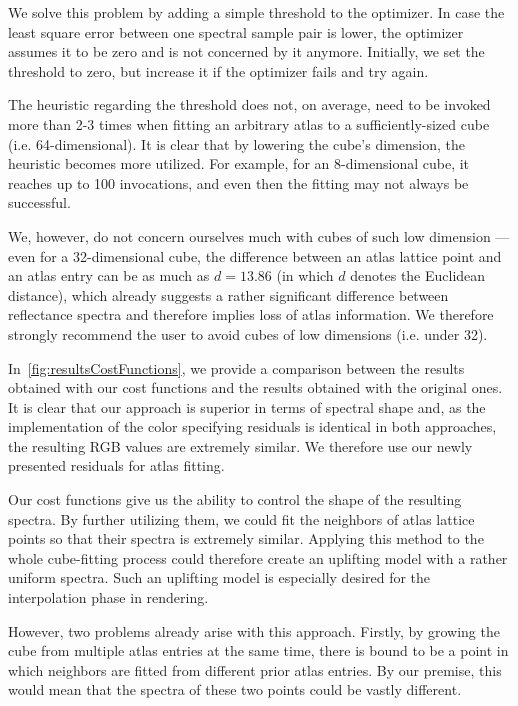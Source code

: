 We solve this problem by adding a simple threshold to the optimizer. In case the least square error between one spectral sample pair is lower, the optimizer assumes it to be zero and is not concerned by it anymore. Initially, we set the threshold to zero, but increase it if the optimizer fails and try again. 

The heuristic regarding the threshold does not, on average, need to be invoked more than 2-3 times when fitting an arbitrary atlas to a sufficiently-sized cube (i.e. 64-dimensional). It is clear that by lowering the cube's dimension, the heuristic becomes more utilized. For example, for an 8-dimensional cube, it reaches up to 100 invocations, and even then the fitting may not always be successful.

We, however, do not concern ourselves much with cubes of such low dimension --- even for a 32-dimensional cube, the difference between an atlas lattice point and an atlas entry can be as much as $d = 13.86$ (in which $d$ denotes the Euclidean distance), which already suggests a rather significant difference between reflectance spectra and therefore implies loss of atlas information. We therefore strongly recommend the user to avoid cubes of low dimensions (i.e. under 32).

In~\cref{fig:resultsCostFunctions}, we provide a comparison between the results obtained with our cost functions and the results obtained with the original ones. It is clear that our approach is superior in terms of spectral shape and, as the implementation of the color specifying residuals is identical in both approaches, the resulting RGB values are extremely similar. We therefore use our newly presented residuals for atlas fitting.

Our cost functions give us the ability to control the shape of the resulting spectra. By further utilizing them, we could fit the neighbors of atlas lattice points so that their spectra is extremely similar. Applying this method to the whole cube-fitting process could therefore create an uplifting model with a rather uniform spectra. Such an uplifting model is especially desired for the interpolation phase in rendering.

However, two problems already arise with this approach. Firstly, by growing the cube from multiple atlas entries at the same time, there is bound to be a point in which neighbors are fitted from different prior atlas entries. By our premise, this would mean that the spectra of these two points could be vastly different.

